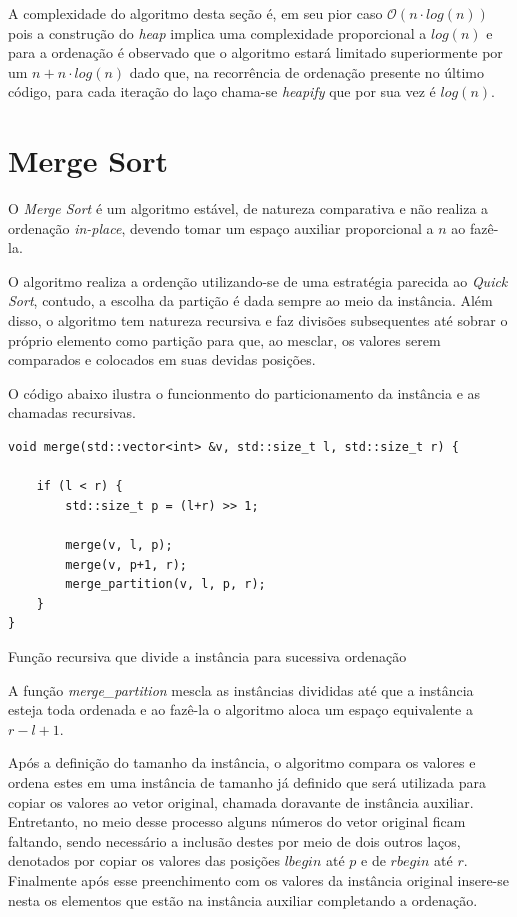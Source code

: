 \documentclass[a4paper, 12pt]{report}
\begin{document}
A complexidade do algoritmo desta seção é, em seu pior caso
$\mathcal{O}(n \cdot log{}(n))$ pois a construção do \emph{heap} implica uma
complexidade proporcional a $log{}(n)$ e para a ordenação é observado que o
algoritmo estará limitado superiormente por um $n + n \cdot log{}(n)$ dado que,
na recorrência de ordenação presente no último código, para cada iteração do
laço chama-se \emph{heapify} que por sua vez é $log{}(n)$.

\section{Merge Sort}
\label{sec-2-2-3}
O \emph{Merge Sort} é um algoritmo estável, de natureza comparativa e não realiza a
ordenação \emph{in-place}, devendo tomar um espaço auxiliar proporcional a $n$ ao
fazê-la.

O algoritmo realiza a ordenção utilizando-se de uma estratégia parecida ao
\emph{Quick Sort}, contudo, a escolha da partição é dada sempre ao meio da
instância. Além disso, o algoritmo tem natureza recursiva e faz divisões
subsequentes até sobrar o próprio elemento como partição para que, ao mesclar,
os valores serem comparados e colocados em suas devidas posições.

O código abaixo ilustra o funcionmento do particionamento da instância e as
chamadas recursivas.

\begin{listing}[H]
\begin{verbatim}
void merge(std::vector<int> &v, std::size_t l, std::size_t r) {

    if (l < r) {
        std::size_t p = (l+r) >> 1;

        merge(v, l, p);
        merge(v, p+1, r);
        merge_partition(v, l, p, r);
    }
}
\end{verbatim}
\caption{Função recursiva que divide a instância para sucessiva ordenação}
\end{listing}

A função \emph{merge\_partition} mescla as instâncias divididas até que a instância
esteja toda ordenada e ao fazê-la o algoritmo aloca um espaço equivalente a
$r-l+1$.

Após a definição do tamanho da instância, o algoritmo compara os valores e
ordena estes em uma instância de tamanho já definido que será utilizada para
copiar os valores ao vetor original, chamada doravante de instância auxiliar.
Entretanto, no meio desse processo alguns números do vetor original ficam
faltando, sendo necessário a inclusão destes por meio de dois outros laços,
denotados por copiar os valores das posições $lbegin$ até $p$ e de $rbegin$
até $r$. Finalmente após esse preenchimento com os valores da instância
original insere-se nesta os elementos que estão na instância auxiliar
completando a ordenação.
\end{document}
